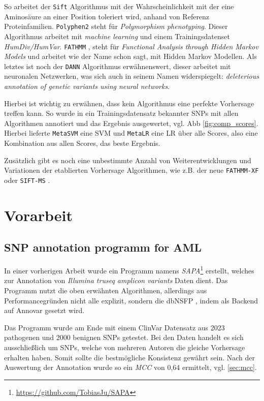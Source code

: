 So arbeitet der \texttt{Sift} \cite{Vaser.2016} Algorithmus mit der Wahrscheinlichkeit mit der eine Aminosäure an einer Position toleriert wird, anhand von Referenz Proteinfamilien. \texttt{Polyphen2} \cite{Adzhubei.2013} steht für \emph{Polymorphism phenotyping}. Dieser Algorithmus arbeitet mit \emph{machine learning} und einem Trainingsdatenset \emph{HumDiv/HumVar}. \texttt{FATHMM} \cite{Shihab.2013}, steht für \emph{Functional Analysis through Hidden Markov Models} und arbeitet wie der Name schon sagt, mit Hidden Markov Modellen. Als letztes ist noch der \texttt{DANN} \cite{Quang.2015} Algorithmus erwähnenswert, dieser arbeitet mit neuronalen Netzwerken, was sich auch in seinem Namen widerspiegelt: \emph{deleterious annotation of genetic variants using neural networks}.

Hierbei ist wichtig zu erwähnen, dass kein Algorithmus eine perfekte Vorhersage treffen kann. So wurde in \cite{Liu.2016} ein Trainingsdatensatz bekannter SNPs mit allen Algorithmen annotiert und das Ergebnis ausgewertet, vgl. \ac{Abb} \ref{fig:comp_scores}. Hierbei lieferte \texttt{MetaSVM} eine \ac{SVM} und \texttt{MetaLR} eine \ac{LR} über alle Scores, also eine Kombination aus allen Scores, das beste Ergebnis.


Zusätzlich gibt es noch eine unbestimmte Anzahl von Weiterentwicklungen und Variationen der etablierten Vorhersage Algorithmen, wie z.B. der neue \texttt{FATHMM-XF} \cite{Rogers.2017} oder \texttt{SIFT-MS} \cite{Smith.2015}.



\section{Vorarbeit}
\subsection{SNP annotation programm for AML}
\label{sec:sapa}
In einer vorherigen Arbeit wurde ein Programm namens \emph{SAPA}\footnote{\url{https://github.com/TobiasJu/SAPA}} erstellt, welches zur Annotation von \emph{Illumina truseq amplicon variants} Daten dient. Das Programm nutzt die oben erwähnten Algorithmen, allerdings aus Performancegründen nicht alle explizit, sondern die dbNSFP \cite{Liu.2016}, indem als Backend auf Annovar \cite{Wang.2010} gesetzt wird. 

Das Programm wurde am Ende mit einem ClinVar Datensatz aus 2023 pathogenen und 2000 benignen \ac{SNP}s getestet. Bei den Daten handelt es sich ausschließlich um \ac{SNP}s, welche von mehreren Autoren die gleiche Vorhersage erhalten haben. Somit sollte die bestmögliche Konsistenz gewährt sein. Nach der Auswertung der Annotation wurde so ein \emph{MCC} von 0,64 ermittelt, vgl. \ref{sec:mcc}.


